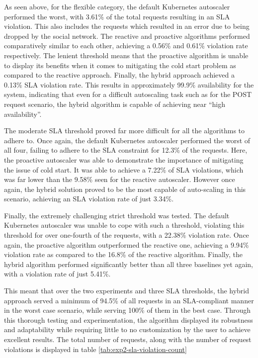 As seen above, for the flexible category, the default Kubernetes autoscaler performed the worst, with 3.61\% of the total requests resulting in an SLA violation. This also includes the requests which resulted in an error due to being dropped by the social network. The reactive and proactive algorithms performed comparatively similar to each other, achieving a 0.56\% and 0.61\% violation rate respectively. The lenient threshold means that the proactive algorithm is unable to display its benefits when it comes to mitigating the cold start problem as compared to the reactive approach. Finally, the hybrid approach achieved a 0.13\% SLA violation rate. This results in approximately 99.9\% availability for the system, indicating that even for a difficult autoscaling task such as for the POST request scenario, the hybrid algorithm is capable of achieving near ``high availability''.\par

The moderate SLA threshold proved far more difficult for all the algorithms to adhere to. Once again, the default Kubernetes autoscaler performed the worst of all four, failing to adhere to the SLA constraint for 12.3\% of the requests. Here, the proactive autoscaler was able to demonstrate the importance of mitigating the issue of cold start. It was able to achieve a 7.22\% of SLA violations, which was far lower than the 9.58\% seen for the reactive autoscaler. However once again, the hybrid solution proved to be the most capable of auto-scaling in this scenario, achieving an SLA violation rate of just 3.34\%.

Finally, the extremely challenging strict threshold was tested. The default Kubernetes autoscaler was unable to cope with such a threshold, violating this threshold for over one-fourth of the requests, with a 22.38\% violation rate. Once again, the proactive algorithm outperformed the reactive one, achieving a 9.94\% violation rate as compared to the 16.8\% of the reactive algorithm. Finally, the hybrid algorithm performed significantly better than all three baselines yet again, with a violation rate of just 5.41\%.\par

This meant that over the two experiments and three SLA thresholds, the hybrid approach served a minimum of 94.5\% of all requests in an SLA-compliant manner in the worst case scenario, while serving 100\% of them in the best case. Through this thorough testing and experimentation, the algorithm displayed its robustness and adaptability while requiring little to no customization by the user to achieve excellent results. The total number of requests, along with the number of request violations is displayed in table \ref{tab:exp2-sla-violation-count}

